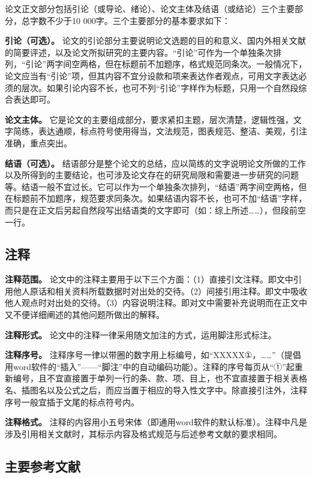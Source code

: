 \documentclass[doublesided]{Style/ucasthesis}%
\begin{document}
论文正文部分包括引论（或导论、绪论）、论文主体及结语（或结论）三个主要部分，总字数不少于10 000字。三个主要部分的基本要求如下：

\textbf{引论（可选）。} 论文的引论部分主要说明论文选题的目的和意义、国内外相关文献的简要评述，以及论文所拟研究的主要内容。``引论''可作为一个单独条次排列，``引论''两字间空两格，但在标题前不加题序，格式规范同条次。一般情况下，论文应当有``引论''项，但其内容不宜分设款和项来表达作者观点，可用文字表达必须的层次。如果引论内容不长，也可不列``引论''字样作为标题，只用一个自然段综合表达即可。

\textbf{论文主体。} 它是论文的主要组成部分，要求紧扣主题，层次清楚，逻辑性强，文字简练，表达通顺，标点符号使用得当，文法规范，图表规范、整洁、美观，引注准确，重点突出。

\textbf{结语（可选）。} 结语部分是整个论文的总结，应以简练的文字说明论文所做的工作以及所得到的主要结论，也可涉及论文存在的研究局限和需要进一步研究的问题等。结语一般不宜过长。它可以作为一个单独条次排列，``结语''两字间空两格，但在标题前不加题序，规范要求同条次。如果结语内容不长，也可不加``结语''字样，而只是在正文后另起自然段写出结语类的文字即可（如：综上所述\ldots{}\ldots{}），但段前空一行。

\hypertarget{section-19}{%
\subsection{注释}\label{section-19}}

\textbf{注释范围。} 论文中的注释主要用于以下三个方面：（1）直接引文注释。即文中引用他人原话和相关资料所载数据时对出处的交待。（2）间接引用注释。即文中吸收他人观点时对出处的交待。（3）内容说明注释。即对文中需要补充说明而在正文中又不便详细阐述的其他问题所做出的解释。

\textbf{注释形式。} 论文中的注释一律采用随文加注的方式，运用脚注形式标注。

\textbf{注释序号。} 注释序号一律以带圈的数字用上标编号，如``XXXXX①，\ldots{}\ldots{}''（提倡用word软件的``插入''------``脚注''中的自动编码功能）。注释的序号每页从``①''起重新编号，且不宜直接置于单列一行的条、款、项、目上，也不宜直接置于相关表格名、插图名以及公式之后，而应当置于相应的导入性文字中。除直接引注外，注释序号一般宜插于文尾的标点符号内。

\textbf{注释格式。} 注释的内容用小五号宋体（即通用word软件的默认标准）。注释中凡是涉及引用相关文献时，其标示内容及格式规范与后述参考文献的要求相同。

\hypertarget{section-20}{%
\subsection{主要参考文献}\label{section-20}}
\end{document}

